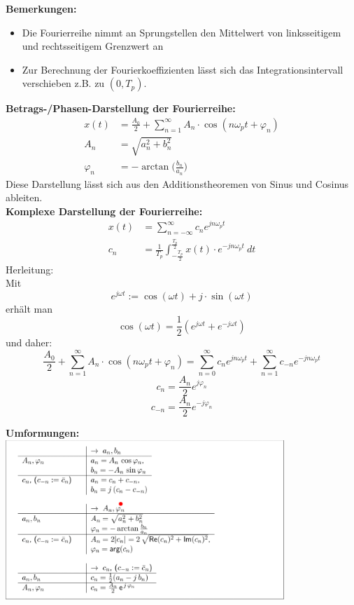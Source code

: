 \documentclass[12pt,a4paper]{scrartcl}
\begin{document}
\noindent \textbf{Bemerkungen:}
    \begin{itemize}
      \item Die Fourierreihe nimmt an Sprungstellen den Mittelwert von linksseitigem und rechtsseitigem Grenzwert an
      \item Zur Berechnung der Fourierkoeffizienten lässt sich das Integrationsintervall verschieben z.B. zu $(0,T_p)$. \\
    \end{itemize} 

    \noindent \textbf{Betrags-/Phasen-Darstellung der Fourierreihe:}
\begin{equation}
    \label{eq:2}
    \begin{split}
    x(t) &=\frac{A_0}{2} + \sum_{n=1}^{\infty} A_n \cdot \cos(n \omega_p t + \varphi_n)  \\
  A_n &= \sqrt{a^2_n + b^2_n} \\
  \varphi_n &= -\arctan\bigg(\frac{b_n}{a_n}\bigg)
      \end{split}
  \end{equation}
  \noindent Diese Darstellung lässt sich aus den Additionstheoremen von Sinus und Cosinus ableiten. \\

  \noindent \textbf{Komplexe Darstellung der Fourierreihe:}
  \begin{equation}
    \label{eq:3}
    \begin{split}
    x(t) &= \sum_{n= -\infty}^{\infty} c_n e^{jn\omega_p t}\\
    c_n &= \frac{1}{T_p} \int_{-\frac{T_p}{2}}^{\frac{T_p}{2}} x(t) \cdot e^{-jn\omega_p t}\ dt
    \end{split}
  \end{equation}
  \noindent Herleitung: \\
  Mit 
  $$e^{j\omega t} := \cos(\omega t) + j\cdot \sin(\omega t)$$ erhält man $$\cos(\omega t) = \frac{1}{2}(e^{j\omega t} +  e^{-j\omega t})$$ 
  und daher:
  $$\frac{A_0}{2} + \sum_{n=1}^{\infty} A_n \cdot \cos(n \omega_p t + \varphi_n) =  \sum_{n=0}^{\infty}c_n e^{jn\omega_p t} +  \sum_{n=1}^{\infty}c_{-n}e^{-jn\omega_p t}$$
  $$c_n = \frac{A_n}{2} e^{j\varphi_n}$$
  $$ c_{-n} = \frac{A_n}{2} e^{-j\varphi_n}$$ 

  \noindent \textbf{Umformungen:}\\
  \includegraphics[height=6cm]{Pictures/Umformung.png} \\
\end{document}
